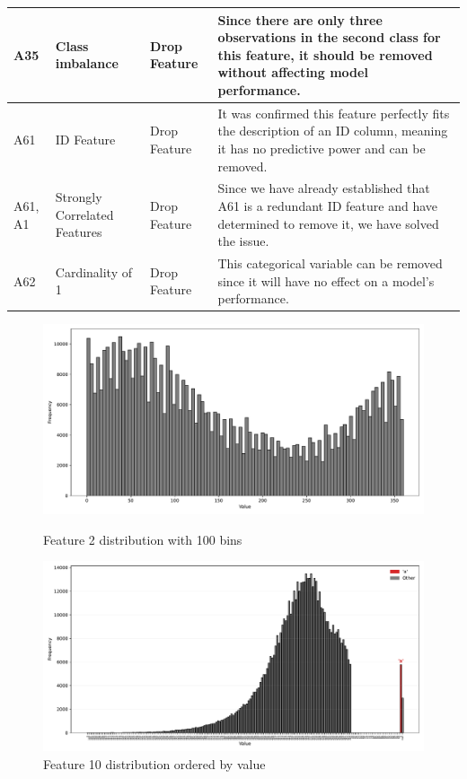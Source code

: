 \documentclass[11pt]{article}
\begin{document}
\begin{longtable}{|p{1.7cm}|l|p{3cm}|p{6cm}|}
	A35 & Class imbalance & Drop Feature & Since there are only three observations in the second class for this feature, it should be removed without affecting model performance. \\ \hline
	A61 & ID Feature & Drop Feature & It was confirmed this feature perfectly fits the description of an ID column, meaning it has no predictive power and can be removed. \\ \hline
	A61, A1 & Strongly Correlated Features & Drop Feature & Since we have already established that A61 is a redundant ID feature and have determined to remove it, we have solved the issue. \\ \hline
	A62 & Cardinality of 1 & Drop Feature & This categorical variable can be removed since it will have no effect on a model's performance. \\ \hline
	
\end{longtable}

	
\begin{figure}[H]
	\centering
	\begin{minipage}[t]{\textwidth}
		\centering
		\includegraphics[width=\textwidth]{images/2_distribution.pdf}
		\caption{Feature 2 distribution with 100 bins}
		\label{fig:f2}
	\end{minipage}
	
	\vspace{1em} %
	
	\begin{minipage}[t]{\textwidth}
		\centering
		\includegraphics[width=\textwidth]{images/10_distribution.pdf}
		\caption{Feature 10 distribution ordered by value}
		\label{fig:f10}
	\end{minipage}
\end{figure}
\end{document}
